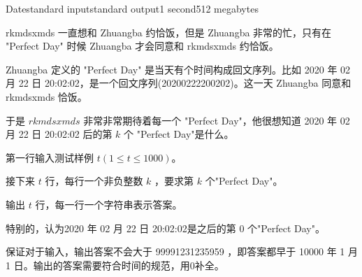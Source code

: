 \begin{problem}{Date}{standard input}{standard output}{1 second}{512 megabytes}

rkmdsxmds 一直想和 Zhuangba 约恰饭，但是 Zhuangba 非常的忙，只有在 "Perfect Day" 时候 Zhuangba 才会同意和 rkmdsxmds 约恰饭。

Zhuangba 定义的 "Perfect Day" 是当天有个时间构成回文序列。比如 2020 年 02 月 22 日 20:02:02，是一个回文序列(20200222200202)。这一天 Zhuangba 同意和 rkmdsxmds 恰饭。

于是 $rkmdsxmds$ 非常非常期待着每一个 "Perfect Day"，他很想知道 2020 年 02 月 22 日 20:02:02 后的第 $k$ 个 "Perfect Day"是什么。

\InputFile

第一行输入测试样例 $t(1\le t \le 1000)$。 

接下来 $t$ 行，每行一个非负整数 $k$ ，要求第 $k$ 个"Perfect Day"。 

\OutputFile

输出 $t$ 行，每一行一个字符串表示答案。

\Example

\begin{example}
%
\end{example}

\Note
特别的，认为2020 年 02 月 22 日 20:02:02是之后的第 0 个"Perfect Day"。

保证对于输入，输出答案不会大于 99991231235959 ，即答案都早于 10000 年 1 月 1 日。输出的答案需要符合时间的规范，用0补全。

\end{problem}
